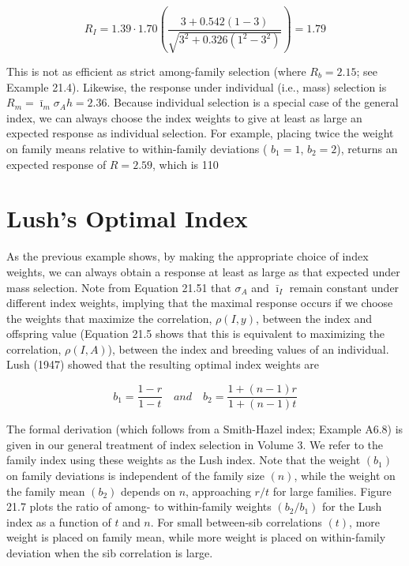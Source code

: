 \documentclass{article}
\begin{document}
\begin{equation}
R_{I}=1.39\cdot1.70\left(\frac{3+0.542(1-3)}{\sqrt{3^{2}+0.326(1^{2}-3^{2})}}\right)=1.79
\end{equation}

This is not as efficient as strict among-family selection (where  $ R_b = 2.15 $; see Example 21.4). Likewise, the response under individual (i.e., mass) selection is  $ R_m = \bar{\imath}_m \sigma_A h = 2.36 $. Because individual selection is a special case of the general index, we can always choose the index weights to give at least as large an expected response as individual selection. For example, placing twice the weight on family means relative to within-family deviations ( $ b_1 = 1 $,  $ b_2 = 2 $), returns an expected response of  $ R = 2.59 $, which is 110%

\section{Lush's Optimal Index}
As the previous example shows, by making the appropriate choice of index weights, we can always obtain a response at least as large as that expected under mass selection. Note from Equation 21.51 that  $ \sigma_{A} $ and  $ \bar{\imath}_{I} $ remain constant under different index weights, implying that the maximal response occurs if we choose the weights that maximize the correlation,  $ \rho(I, y) $, between the index and offspring value (Equation 21.5 shows that this is equivalent to maximizing the correlation,  $ \rho(I, A) $), between the index and breeding values of an individual. Lush (1947) showed that the resulting optimal index weights are

\begin{equation}
b_{1}=\frac{1-r}{1-t}\quad and\quad b_{2}=\frac{1+(n-1)r}{1+(n-1)t}
\tag{21.54}
\label{eq:21_54}
\end{equation}

The formal derivation (which follows from a Smith-Hazel index; Example A6.8) is given in our general treatment of index selection in Volume 3. We refer to the family index using these weights as the Lush index. Note that the weight  $ (b_1) $ on family deviations is independent of the family size  $ (n) $, while the weight on the family mean  $ (b_2) $ depends on  $ n $, approaching  $ r/t $ for large families. Figure 21.7 plots the ratio of among- to within-family weights  $ (b_2/b_1) $ for the Lush index as a function of  $ t $ and  $ n $. For small between-sib correlations  $ (t) $, more weight is placed on family mean, while more weight is placed on within-family deviation when the sib correlation is large.
\end{document}
